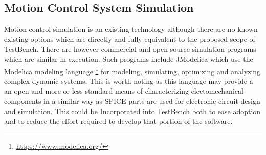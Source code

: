 \documentclass{article}
\begin{document}
\subsection{Motion Control System Simulation}
Motion control simulation is an existing technology although there are no known existing options which are directly and fully equivalent to the proposed scope of TestBench. There are however commercial and open source simulation programs which are similar in execution. Such programs include JModelica which use the Modelica modeling language \footnote{\url{https://www.modelica.org/}} for modeling, simulating, optimizing and analyzing complex dynamic systems. This is worth noting as this language may provide a an open and more or less standard means of characterizing electomechanical components in a similar way as SPICE parts are used for electronic circuit design and simulation. This could be Incorporated into TestBench both to ease adoption and to reduce the effort required to develop that portion of the software. 
\end{document}
